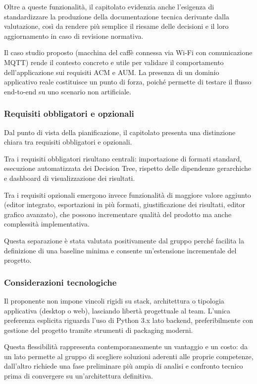 \documentclass[a4paper,12pt]{article}
\begin{document}
Oltre a queste funzionalità, il capitolato evidenzia anche l'esigenza di standardizzare la produzione della documentazione tecnica derivante dalla valutazione, così da rendere più semplice il riesame delle decisioni e il loro aggiornamento in caso di revisione normativa.

Il caso studio proposto (macchina del caffè connessa via Wi-Fi con comunicazione MQTT) rende il contesto concreto e utile per validare il comportamento dell'applicazione sui requisiti ACM e AUM. La presenza di un dominio applicativo reale costituisce un punto di forza, poiché permette di testare il flusso end-to-end su uno scenario non artificiale.

\subsubsection{Requisiti obbligatori e opzionali}

Dal punto di vista della pianificazione, il capitolato presenta una distinzione chiara tra requisiti obbligatori e opzionali.

Tra i requisiti obbligatori risultano centrali: importazione di formati standard, esecuzione automatizzata dei Decision Tree, rispetto delle dipendenze gerarchiche e dashboard di visualizzazione dei risultati.

Tra i requisiti opzionali emergono invece funzionalità di maggiore valore aggiunto (editor integrato, esportazioni in più formati, giustificazione dei risultati, editor grafico avanzato), che possono incrementare qualità del prodotto ma anche complessità implementativa.

Questa separazione è stata valutata positivamente dal gruppo perché facilita la definizione di una baseline minima e consente un'estensione incrementale del progetto.

\subsubsection{Considerazioni tecnologiche}

Il proponente non impone vincoli rigidi su stack, architettura o tipologia applicativa (desktop o web), lasciando libertà progettuale al team. L'unica preferenza esplicita riguarda l'uso di Python 3.x lato backend, preferibilmente con gestione del progetto tramite strumenti di packaging moderni.

Questa flessibilità rappresenta contemporaneamente un vantaggio e un costo: da un lato permette al gruppo di scegliere soluzioni aderenti alle proprie competenze, dall'altro richiede una fase preliminare più ampia di analisi e confronto tecnico prima di convergere su un'architettura definitiva.
\end{document}
